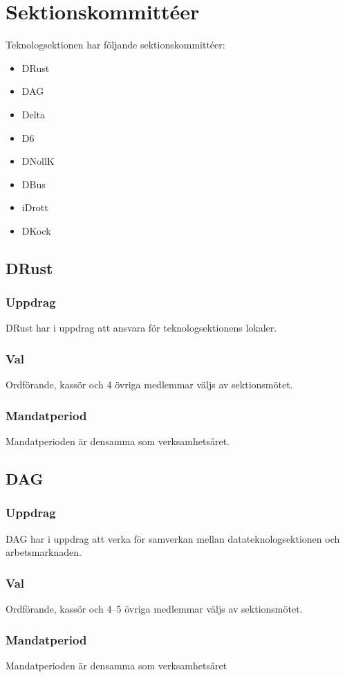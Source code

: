 \section{Sektionskommittéer}

Teknologsektionen har följande sektionskommittéer: 
\begin{itemize}
  \item DRust
  \item DAG 
  \item Delta 
  \item D6 
  \item DNollK
  \item DBus
  \item iDrott
  \item DKock
\end{itemize}

\subsection{DRust}
\subsubsection{Uppdrag}
DRust har i uppdrag att ansvara för teknologsektionens lokaler.
\subsubsection{Val}
Ordförande, kassör och 4 övriga medlemmar väljs av sektionsmötet. 
\subsubsection{Mandatperiod}
Mandatperioden är densamma som verksamhetsåret. 

\subsection{DAG}
\subsubsection{Uppdrag} 
DAG har i uppdrag att verka för samverkan mellan datateknologsektionen och arbetsmarknaden. 
\subsubsection{Val}
Ordförande, kassör och 4--5 övriga medlemmar väljs av sektionsmötet.
\subsubsection{Mandatperiod}
Mandatperioden är densamma som verksamhetsåret


